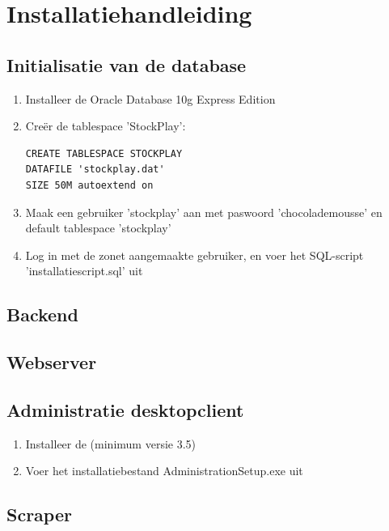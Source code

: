 %
%

\section{Installatiehandleiding}

\subsection{Initialisatie van de database}

\begin{enumerate}
\item{Installeer de Oracle Database 10g Express Edition}
\item{Cre\"er de tablespace 'StockPlay': 
\begin{verbatim}
CREATE TABLESPACE STOCKPLAY 
DATAFILE 'stockplay.dat' 
SIZE 50M autoextend on
\end{verbatim}
}
\item{Maak een gebruiker 'stockplay' aan met paswoord 'chocolademousse' en default tablespace 'stockplay'}
\item{Log in met de zonet aangemaakte gebruiker, en voer het SQL-script 'installatiescript.sql' uit}
\end{enumerate}


\subsection{Backend}

\subsection{Webserver}

\subsection{Administratie desktopclient}
\begin{enumerate}
\item Installeer de  (minimum versie 3.5)
\item{Voer het installatiebestand AdministrationSetup.exe uit}
\end{enumerate}

\subsection{Scraper}

